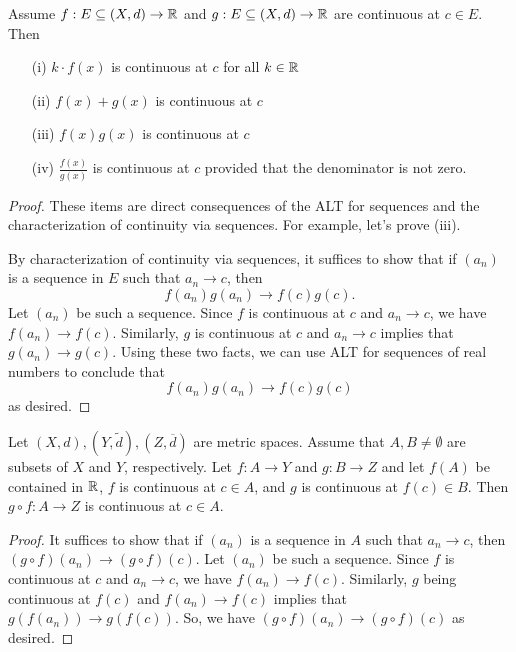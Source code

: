 \documentclass[a4paper]{article}
\begin{document}
\begin{theorem}
    Assume \( f: E \subseteq (X,d) \to \mathbb{R}   \) and \( g: E \subseteq (X,d) \to \mathbb{R}   \) are continuous at \( c \in E  \). Then
    \begin{enumerate}
        \item[(i)] \( k \cdot f (x) \) is continuous at \( c  \) for all \( k \in  \mathbb{R}  \)
        \item[(ii)] \( f(x) + g(x)  \) is continuous at \( c  \)
        \item[(iii)] \( f(x) g(x)  \) is continuous at \( c  \)
        \item[(iv)] \( \frac{ f(x) }{  g(x) }  \) is continuous at \( c  \) provided that the denominator is not zero.
    \end{enumerate}
\end{theorem}
\begin{proof}
These items are direct consequences of the ALT for sequences and the characterization of continuity via sequences. For example, let's prove (iii).

By characterization of continuity via sequences, it suffices to show that if \( ({a}_{n}) \) is a sequence in \( E  \) such that \( {a}_{n} \to c  \), then
\[  f({a}_{n}) g({a}_{n}) \to f(c) g(c). \]
Let \( ({a}_{n}) \) be such a sequence. Since \( f \) is continuous at \( c  \) and \( {a}_{n} \to c  \), we have \( f({a}_{n}) \to f(c) \). Similarly, \( g  \) is continuous at \( c  \) and \( {a}_{n} \to c  \) implies that \( g({a}_{n}) \to g(c) \). Using these two facts, we can use ALT for sequences of real numbers to conclude that 
\[  f({a}_{n}) g({a}_{n}) \to f(c) g(c) \]
as desired.
\end{proof}

\begin{theorem}
    Let \( (X,d), (Y, \tilde{d}), (Z,\overline{d}) \) are metric spaces. Assume that \( A,B \neq \emptyset \) are subsets of \( X  \) and \( Y  \), respectively. Let \( f: A \to Y  \) and \( g: B \to Z  \) and let \( f(A) \) be contained in \( \mathbb{R}  \), \( f  \) is continuous at \( c \in A  \), and \( g \) is continuous at \( f(c) \in B \). Then \( g \circ f : A \to Z  \) is continuous at \( c \in A  \).
\end{theorem}

\begin{proof}
It suffices to show that if \( ({a}_{n}) \) is a sequence in \( A  \) such that \( {a}_{n} \to c  \), then \( (g \circ f)({a}_{n}) \to (g \circ f)(c) \). Let \( ({a}_{n}) \) be such a sequence. Since \( f \) is continuous at \( c  \) and \( {a}_{n} \to c  \), we have \( f({a}_{n}) \to f(c) \). Similarly, \( g  \) being continuous at \( f(c)  \) and \( f({a}_{n}) \to f(c) \) implies that \( g(f({a}_{n})) \to g(f(c)) \). So, we have \( (g \circ f)({a}_{n}) \to (g \circ f)(c) \) as desired.
\end{proof}
\end{document}
